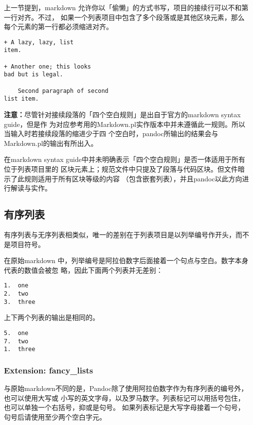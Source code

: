 \documentclass[fancyhdr,bookmark]{ctexbook}
\begin{document}
上一节提到，markdown
允许你以「偷懒」的方式书写，项目的接续行可以不和第一行对齐。不过，
如果一个列表项目中包含了多个段落或是其他区块元素，那么每个元素的第一行都必须缩进对齐。

\begin{lstlisting}
+ A lazy, lazy, list
item.

+ Another one; this looks
bad but is legal.

    Second paragraph of second
list item.
\end{lstlisting}

\textbf{注意：}尽管针对接续段落的「四个空白规则」是出自于官方的markdown
syntax guide，但是作
为对应参考用的Markdown.pl实作版本中并未遵循此一规则。所以当输入时若接续段落的缩进少于四
个空白时，pandoc所输出的结果会与Markdown.pl的输出有所出入。

在markdown syntax
guide中并未明确表示「四个空白规则」是否一体适用于所有位于列表项目里的
区块元素上；规范文件中只提及了段落与代码区块。但文件暗示了此规则适用于所有区块等级的内容
（包含嵌套列表），并且pandoc以此方向进行解读与实作。

\hypertarget{ux6709ux5e8fux5217ux8868}{%
\subsection{有序列表}\label{ux6709ux5e8fux5217ux8868}}

有序列表与无序列表相类似，唯一的差别在于列表项目是以列举编号作开头，而不是项目符号。

在原始markdown
中，列举编号是阿拉伯数字后面接着一个句点与空白。数字本身代表的数值会被忽
略，因此下面两个列表并无差别：

\begin{lstlisting}
1.  one
2.  two
3.  three
\end{lstlisting}

上下两个列表的输出是相同的。

\begin{lstlisting}
5.  one
7.  two
1.  three
\end{lstlisting}

\hypertarget{extension-fancy_lists}{%
\subsubsection{Extension: fancy\_lists}\label{extension-fancy_lists}}

与原始markdown不同的是，Pandoc除了使用阿拉伯数字作为有序列表的编号外，也可以使用大写或
小写的英文字母，以及罗马数字。列表标记可以用括号包住，也可以单独一个右括号，抑或是句号。
如果列表标记是大写字母接着一个句号，句号后请使用至少两个空白字元。
\end{document}
